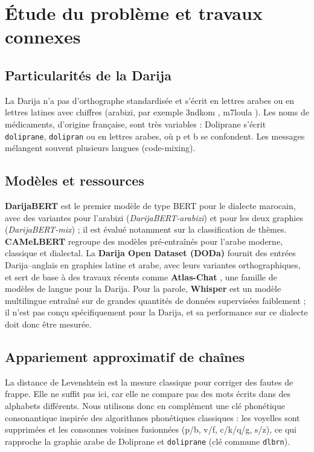 \documentclass[11pt,a4paper]{article}
\begin{document}
\section{\'Etude du probl\`eme et travaux connexes}
\subsection{Particularit\'es de la Darija}
La Darija n'a pas d'orthographe standardis\'ee et s'\'ecrit en lettres arabes ou en lettres latines avec chiffres (arabizi, par exemple \og 3ndkom \fg, \og m7loula \fg). Les noms de m\'edicaments, d'origine fran\c{c}aise, sont tr\`es variables : \og Doliprane \fg{} s'\'ecrit \texttt{doliprane}, \texttt{dolipran} ou en lettres arabes, o\`u p et b se confondent. Les messages m\'elangent souvent plusieurs langues (code-mixing).

\subsection{Mod\`eles et ressources}
\textbf{DarijaBERT} \cite{gaanoun2023} est le premier mod\`ele de type BERT pour le dialecte marocain, avec des variantes pour l'arabizi (\emph{DarijaBERT-arabizi}) et pour les deux graphies (\emph{DarijaBERT-mix}) ; il est \'evalu\'e notamment sur la classification de th\`emes. \textbf{CAMeLBERT} \cite{inoue2021} regroupe des mod\`eles pr\'e-entra\^in\'es pour l'arabe moderne, classique et dialectal. La \textbf{Darija Open Dataset (DODa)} \cite{doda2021,doda2024} fournit des entr\'ees Darija--anglais en graphies latine et arabe, avec leurs variantes orthographiques, et sert de base \`a des travaux r\'ecents comme \textbf{Atlas-Chat} \cite{atlaschat2024}, une famille de mod\`eles de langue pour la Darija. Pour la parole, \textbf{Whisper} \cite{radford2022} est un mod\`ele multilingue entra\^in\'e sur de grandes quantit\'es de donn\'ees supervis\'ees faiblement ; il n'est pas con\c{c}u sp\'ecifiquement pour la Darija, et sa performance sur ce dialecte doit donc \^etre mesur\'ee.

\subsection{Appariement approximatif de cha\^ines}
La distance de Levenshtein \cite{levenshtein1966} est la mesure classique pour corriger des fautes de frappe. Elle ne suffit pas ici, car elle ne compare pas des mots \'ecrits dans des alphabets diff\'erents. Nous utilisons donc en compl\'ement une cl\'e phon\'etique consonantique inspir\'ee des algorithmes phon\'etiques classiques : les voyelles sont supprim\'ees et les consonnes voisines fusionn\'ees (p/b, v/f, c/k/q/g, s/z), ce qui rapproche la graphie arabe de Doliprane et \texttt{doliprane} (cl\'e commune \texttt{dlbrn}).
\end{document}
